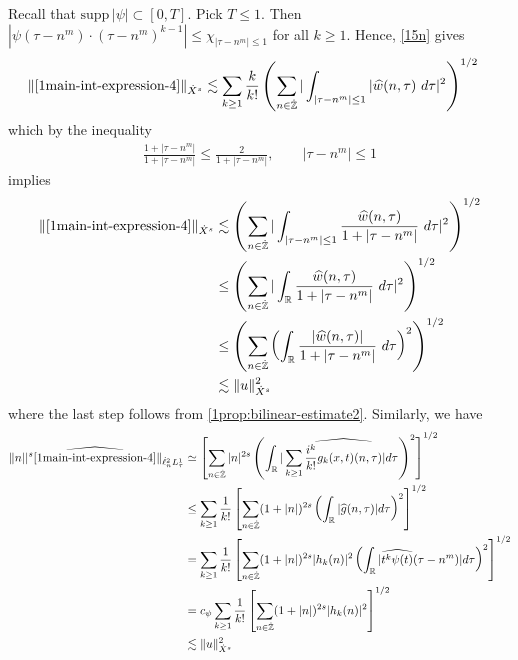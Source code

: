 Recall that $\text{supp} \, |\psi| \subset [0, T ]$. Pick $T \le 1$. 
Then $| \psi\left( \tau - n^m \right) \cdot \left( \tau - n^m \right)^{k 
-1} | \le \chi_{| \tau - n^m | \le 1}$ for all $k \ge 1$. Hence, \eqref{15n} gives
%
\begin{equation*}
	\begin{split}
		\|\eqref{1main-int-expression-4} \|_{\dot{X}^s} 
		& \lesssim \sum_{k \ge 1} \frac{k}{k!}  \left( \sum_{n \in \dot{\mathbb{Z}}} | 
		\int_{| \tau - n^m  |\le 1} | \widehat{w}(n, \tau) \ d \tau |^2 
		\right)^{1/2}
	\end{split}
\end{equation*}
%
which by the inequality
%
\begin{equation*}
	\begin{split}
		\frac{1 + | \tau - n^m |}{1 + | \tau  - n^m |} \le 
		\frac{2}{1 + | \tau - n^m |}, \qquad | \tau - n^m  | \le 1
	\end{split}
\end{equation*}
%
implies
%
\begin{equation}
\label{1main-int4-est-X-s-part}
	\begin{split}
		\|\eqref{1main-int-expression-4}\|_{\dot{X}^s}
		& \lesssim \left( \sum_{n \in \dot{\mathbb{Z}}} | \int_{| \tau - n^m| \le 1 }
		\frac{\widehat{w}(n, \tau)}{1 + | \tau - n^m |} \ d \tau |^2 
		\right)^{1/2}
		\\
		& \le \left( \sum_{n \in \dot{\mathbb{Z}}} | \int_{\mathbb{R}}
		\frac{\widehat{w}(n, \tau)}{1 + | \tau - n^m |} \ d \tau |^2 
		\right)^{1/2} \\
		& \le \left( \sum_{n \in \dot{\mathbb{Z}}} \left( \int_{\mathbb{R}} 
		\frac{|\widehat{w}(n, \tau)|}{1 + | \tau - n^m |}  \ d \tau  \right)^2
		\right)^{1/2} \\
		& \lesssim \|u\|_{\dot{X}^s}^2
	\end{split}
\end{equation}
%
where the last step follows from \cref{1prop:bilinear-estimate2}. Similarly,
we have
%
%
\begin{equation}
\label{1main-int4-est-Y-s-part}
	\begin{split}
		\| n| |^s \widehat{\eqref{1main-int-expression-4}}\|_{\dot{\ell}^2_n L^1_\tau}
		& \simeq \left[ \sum_{n \in
		\dot{\mathbb{Z}}}|n|^{2s} \left( \int_{\mathbb{R}} | \sum_{k \ge 1}
		\widehat{\frac{i^{k}}{k!}g_{k}(x,t)(n, \tau)} |d \tau \right)^{2} \right]^{1/2}
		\\
		& \le \sum_{k \ge 1} \frac{1}{k!} \left[ \sum_{n \in \dot{\mathbb{Z}}} (1 + | n
		|)^{2s} \left( \int_{\mathbb{R}} | \widehat{g}(n, \tau) | d \tau \right)^{2}
		\right]^{1/2}
		\\
		& = \sum_{k \ge 1} \frac{1}{k!} \left[ \sum_{n \in \dot{\mathbb{Z}}} (1 + | n
		|)^{2s} | h_{k}(n) |^2 \left( \int_{\mathbb{R}} | \widehat{t^{k} \psi(t)}(\tau -
		n^m) |d \tau \right)^{2} \right]^{1/2}
		\\
		& = c_{\psi} \sum_{k \ge 1} \frac{1}{k!} \left[ \sum_{n \in \dot{\mathbb{Z}}} (1 + | n
		|)^{2s} | h_{k}(n) |^2 \right]^{1/2}
		\\
		& \lesssim \|u\|_{\dot{X}^s}^2
	\end{split}
\end{equation}
